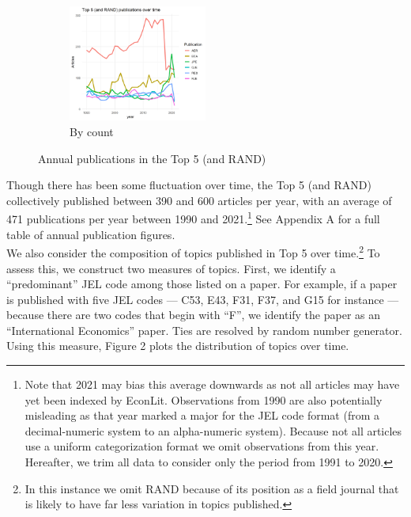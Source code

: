 \documentclass[11pt, letterpaper, twoside]{article}
\begin{document}
\begin{figure}[!ht]
    \begin{subfigure}[h]{\textwidth}
        \centering
        \includegraphics[width=0.5\textwidth]{top5_over_time.png}
        \caption{By count}
    \end{subfigure}
    \caption{Annual publications in the Top 5 (and RAND)}
\end{figure}

Though there has been some fluctuation over time, the Top 5 (and RAND) collectively published between 390 and 600 articles per year, with an average of 471 publications per year between 1990 and 2021.\footnote{Note that 2021 may bias this average downwards as not all articles may have yet been indexed by EconLit. Observations from 1990 are also potentially misleading as that year marked a major for the JEL code format (from a decimal-numeric system to an alpha-numeric system). Because not all articles use a uniform categorization format we omit observations from this year. Hereafter, we trim all data to consider only the period from 1991 to 2020.} See Appendix A for a full table of annual publication figures.\\

We also consider the composition of topics published in Top 5 over time.\footnote{In this instance we omit RAND because of its position as a field journal that is likely to have far less variation in topics published.} To assess this, we construct two measures of topics. First, we identify a ``predominant'' JEL code among those listed on a paper. For example, if a paper is published with five JEL codes --- C53, E43, F31, F37, and G15 for instance --- because there are two codes that begin with ``F'', we identify the paper as an ``International Economics'' paper. Ties are resolved by random number generator. Using this measure, Figure 2 plots the distribution of topics over time.
\end{document}
